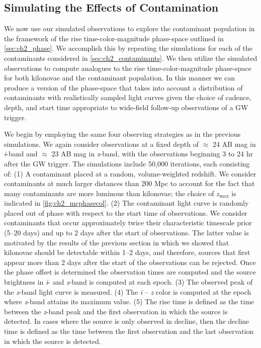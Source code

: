 \subsection{Simulating the Effects of Contamination}
\label{sec:ch2_MCsims_cont}

We now use our simulated observations to explore the contaminant population in the framework of the rise time-color-magnitude phase-space outlined in \autoref{sec:ch2_phase}. We accomplish this by repeating the simulations for each of the contaminants considered in \autoref{sec:ch2_contaminants}. We then utilize the simulated observations to compute analogues to the rise time-color-magnitude phase-space for both kilonovae and the contaminant population. In this manner we can produce a version of the phase-space that takes into account a distribution of contaminants with realistically sampled light curves given the choice of cadence, depth, and start time appropriate to wide-field follow-up observations of a GW trigger.

We begin by employing the same four observing strategies as in the previous simulations. We again consider observations at a fixed depth of $\approx$ 24 AB mag in {\em i}-band and $\approx$ 23 AB mag in {\em z}-band, with the observations beginning 3 to 24 hr after the GW trigger. The simulations include 50,000 iterations, each consisting of: (1) A contaminant placed at a random, volume-weighted redshift. We consider contaminants at much larger distances than 200 Mpc to account for the fact that many contaminants are more luminous than kilonovae; the choice of $z_{\text{max}}$ is indicated in \autoref{fig:ch2_mcphasecol}. (2) The contaminant light curve is randomly placed out of phase with respect to the start time of observations. We consider contaminants that occur approximately twice their characteristic timescale prior (5--20 days) and up to 2 days after the start of observations. The latter value is motivated by the results of the previous section in which we showed that kilonovae should be detectable within 1--2 days, and therefore, sources that first appear more than 2 days after the start of the observations can be rejected. Once the phase offset is determined the observation times are computed and the source brightness in {\em i}- and {\em z}-band is computed at each epoch. (3) The observed peak of the {\em z}-band light curve is measured. (4) The {\em i} -- {\em z} color is computed at the epoch where {\em z}-band attains its maximum value. (5) The rise time is defined as the time between the {\em z}-band peak and the first observation in which the source is detected. In cases where the source is only observed in decline, then the decline time is defined as the time between the first observation and the last observation in which the source is detected.

